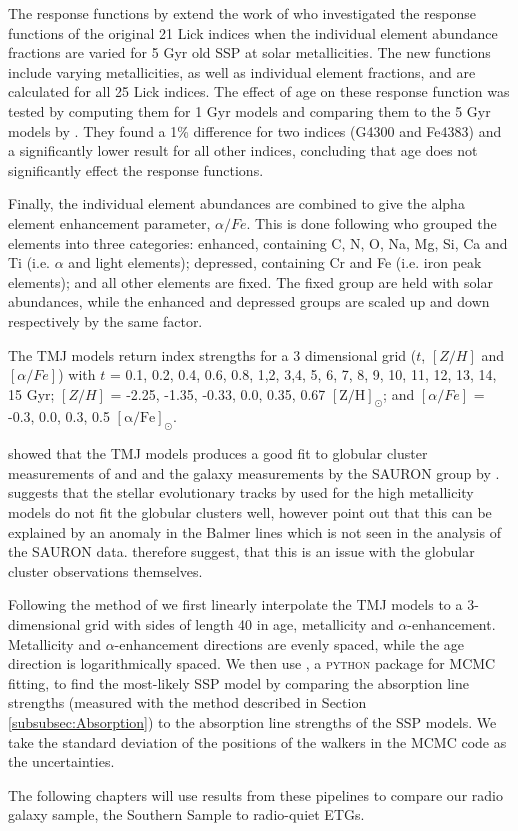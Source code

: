 			The response functions by \citet{Korn2005} extend the work of \citet{Tripicco1995} who investigated the response functions of the original 21 Lick indices when the individual element abundance fractions are varied for 5 Gyr old SSP at solar metallicities. The new functions include varying metallicities, as well as individual element fractions, and are calculated for all 25 Lick indices. The effect of age on these response function was tested by computing them for 1 Gyr models and comparing them to the 5 Gyr models by \citet{Tripicco1995}. They found a 1\% difference for two indices (G4300 and Fe4383) and a significantly lower result for all other indices, concluding that age does not significantly effect the response functions.

			Finally, the individual element abundances are combined to give the alpha element enhancement parameter, $\alpha/Fe$. This is done following \citet{Trager2000} who grouped the elements into three categories: enhanced, containing C, N, O, Na, Mg, Si, Ca and Ti (i.e. $\alpha$ and light elements); depressed, containing Cr and Fe (i.e. iron peak elements); and all other elements are fixed. The fixed group are held with solar abundances, while the enhanced and depressed groups are scaled up and down respectively by the same factor. 

			The TMJ models return index strengths for a 3 dimensional grid ($t$, $[Z/H]$ and $[\alpha/Fe]$) with $t$ = 0.1, 0.2, 0.4, 0.6, 0.8, 1,2, 3,4, 5, 6, 7, 8, 9, 10, 11, 12, 13, 14, 15 Gyr; $[Z/H]$ = -2.25, -1.35, -0.33, 0.0, 0.35, 0.67 $\mathrm{[Z/H]_\odot}$; and $[\alpha/Fe]$ = -0.3, 0.0, 0.3, 0.5 $\mathrm{[\alpha/Fe]_\odot}$.

			\citet{Thomas2010} showed that the TMJ models produces a good fit to globular cluster measurements of \citet{Puzia2002} and \citet{Schiavon2005} and the galaxy measurements by the SAURON group by \citet{Kuntschner2010}. \citet{Conroy2010} suggests that the stellar evolutionary tracks by \citet{Girardi2000} used for the high metallicity models do not fit the globular clusters well, however \citet{Thomas2010} point out that this can be explained by an anomaly in the Balmer lines which is not seen in the analysis of the SAURON data. \citet{Thomas2010} therefore suggest, that this is an issue with the globular cluster observations themselves. 

			Following the method of \citet{McDermid2006} we first linearly interpolate the TMJ models to a 3-dimensional grid with sides of length 40 in age, metallicity and $\alpha$-enhancement. Metallicity and $\alpha$-enhancement directions are evenly spaced, while the age direction is logarithmically spaced. We then use , a \textsc{python} package for MCMC fitting, to find the most-likely SSP model by comparing the absorption line strengths (measured with the method described in Section \ref{subsubsec:Absorption}) to the absorption line strengths of the SSP models. We take the standard deviation of the positions of the walkers in the MCMC code as the uncertainties.

			The following chapters will use results from these pipelines to compare our radio galaxy sample, the Southern Sample to radio-quiet ETGs.